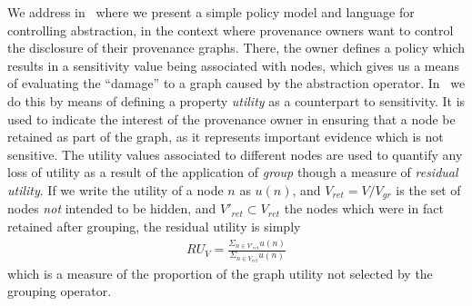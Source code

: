 We address   in~\citep{Missier2014} where we present a simple policy model and language for controlling abstraction, in the context where provenance owners want to control the disclosure of their provenance graphs. There, the owner defines a policy which results in a sensitivity value being associated with nodes, which gives us a means of evaluating the ``damage'' to a graph caused by the abstraction operator.
In~\citep{Missier2014} we do this by means of defining a property \emph{utility} as a counterpart to sensitivity. It is used to indicate  the interest of the provenance owner in ensuring that a node be retained as part of the graph, as it represents important evidence which is not sensitive.   The utility values associated to different nodes are used to quantify any loss of utility as a result of the application of \emph{group} though a measure of \emph{residual utility}. If we write the utility of a node $n$ as $u(n)$, and  $V_{ret} = V / V_{gr}$ is the set of nodes \emph{not} intended to be hidden, and $V'_{ret} \subset V_{ret}$ the nodes which were in fact retained after grouping, the  residual utility is simply
\begin{align}
  RU_{V} = \frac{\Sigma_{n\in V'_{ret}} u(n)}{\Sigma_{n\in V_{ret}} u(n)}
\end{align}
  which is a measure of the proportion of the graph utility not selected by the grouping operator. 





